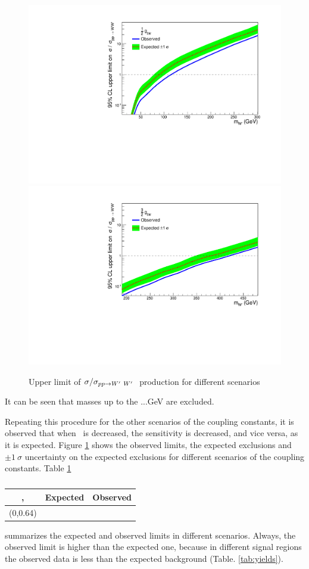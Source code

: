 \begin{figure}[!htb]
  \hspace{3mm}
  \includegraphics*[width=.45\textwidth]{figs/mixHalvedb.pdf}
  \hspace{3mm}
  \includegraphics*[width=.45\textwidth]{figs/mix3Over2b.pdf}
  \caption{Upper limit of $\sigma/\sigma_{pp \rightarrow W^\prime~ W^\prime~}$ production for different scenarios}
  \label{fig:brazilianFlags}
\end{figure}
It can be seen that \wprime masses up to the ...GeV are excluded.  

Repeating this procedure for the other scenarios of the coupling constants, it is observed that when \gL ~is decreased, the sensitivity is decreased, and vice versa, as it is expected. Figure \ref{fig:brazilianFlags} shows the observed limits, the expected exclusions and $\pm 1 ~\sigma$ uncertainty on the expected exclusions for different scenarios of the coupling constants. Table \ref{tab:ObservedLimits}
\begin{table}[htb]
	\centering
	\caption{ \label{tab:ObservedLimits} }
	\begin{tabular}{|c|c|c|}
	\hline
	\gR, \gL           & Expected & Observed \\\hline
	(0,0.64)           &      &      \\\hline
	\end{tabular}
\end{table}
summarizes the expected and observed limits in different scenarios. Always, the observed limit is higher than the expected one, because in different signal regions the observed data is less than the expected background (Table. \ref{tab:yields}).


